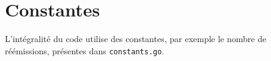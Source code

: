 \section{Constantes}
L'intégralité du code utilise des constantes, par exemple le nombre de réémissions, présentes dans \texttt{constants.go}.
